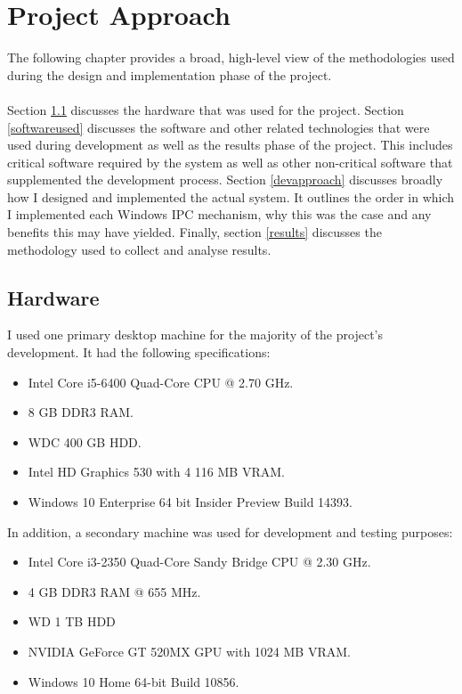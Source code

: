 \documentclass[12pt] {newrucsthesis}    %
\begin{document}
  \chapter{Project Approach}
    The following chapter provides a broad, high-level view of the methodologies used during the
    design and implementation phase of the project.
    \\\\
    Section \ref{hardwareused} discusses the hardware that was used for the project.
    Section \ref{softwareused} discusses the software and other related technologies that were used
    during development as well as the results phase of the project. This includes critical software
    required by the system as well as other non-critical software that supplemented the development process.
    Section \ref{devapproach} discusses broadly how I designed and implemented the actual system. It outlines the
    order in which I implemented each Windows IPC mechanism, why this was the case and any benefits this
    may have yielded. Finally, section \ref{results} discusses the methodology used to collect and analyse results.

    \section{Hardware} \label{hardwareused} %
      I used one primary desktop machine for the majority of the project's development. It had the following specifications:
        \begin{itemize}
          \item Intel Core i5-6400 Quad-Core CPU @ 2.70 GHz.
          \item 8 GB DDR3 RAM.
          \item WDC 400 GB HDD.
          \item Intel HD Graphics 530 with 4 116 MB VRAM.
          \item Windows 10 Enterprise 64 bit Insider Preview Build 14393.
        \end{itemize}
      In addition, a secondary machine was used for development and testing purposes:
        \begin{itemize}
          \item	Intel Core i3-2350 Quad-Core Sandy Bridge CPU @ 2.30 GHz.
        	\item	4 GB DDR3 RAM @ 655 MHz.
          \item WD 1 TB HDD
        	\item NVIDIA GeForce GT 520MX GPU with 1024 MB VRAM.
          \item Windows 10 Home 64-bit Build 10856.
        \end{itemize}
\end{document}
